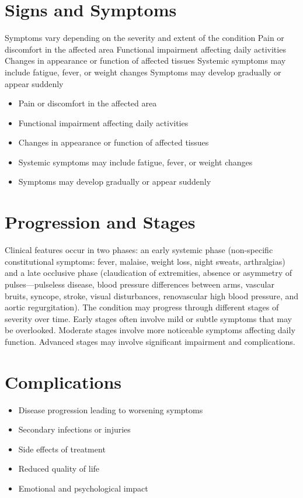 \section{Signs and Symptoms}
Symptoms vary depending on the severity and extent of the condition Pain or discomfort in the affected area Functional impairment affecting daily activities Changes in appearance or function of affected tissues Systemic symptoms may include fatigue, fever, or weight changes Symptoms may develop gradually or appear suddenly

\begin{itemize}[noitemsep]
  \item Pain or discomfort in the affected area
  \item Functional impairment affecting daily activities
  \item Changes in appearance or function of affected tissues
  \item Systemic symptoms may include fatigue, fever, or weight changes
  \item Symptoms may develop gradually or appear suddenly
\end{itemize}
\section{Progression and Stages}
Clinical features occur in two phases: an early systemic phase (non-specific constitutional symptoms: fever, malaise, weight loss, night sweats, arthralgias) and a late occlusive phase (claudication of extremities, absence or asymmetry of pulses---pulseless disease, blood pressure differences between arms, vascular bruits, syncope, stroke, visual disturbances, renovascular high blood pressure, and aortic regurgitation). The condition may progress through different stages of severity over time. Early stages often involve mild or subtle symptoms that may be overlooked. Moderate stages involve more noticeable symptoms affecting daily function. Advanced stages may involve significant impairment and complications.
\section{Complications}
\begin{itemize}[noitemsep]
  \item Disease progression leading to worsening symptoms
  \item Secondary infections or injuries
  \item Side effects of treatment
  \item Reduced quality of life
  \item Emotional and psychological impact
\end{itemize}
